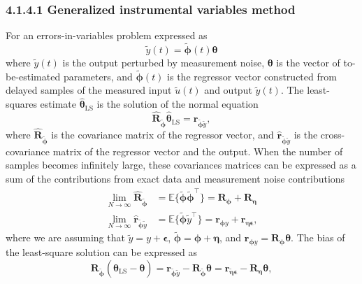 \documentclass[11pt]{article}
\begin{document}
\begin{itemize}
\begin{itemize}
        \subsubsection*{4.1.4.1 Generalized instrumental variables method}
        For an errors-in-variables problem expressed as
        \begin{equation} \tag{4.27} \widetilde{y}(t) = \widetilde{\bm{\phi}}(t) \bm{\theta}   \end{equation}
        where $\widetilde{y}(t)$ is the output perturbed by measurement noise, $\bm{\theta}$ is the vector of to-be-estimated parameters, and $\widetilde{\bm{\phi}}(t)$ is the regressor vector constructed from delayed samples of the measured input $\widetilde{u}(t)$ and output $\widetilde{y}(t)$.
        The least-squares estimate $\widehat{\bm{\theta}}_{\mathrm{LS}}$ is the solution of the normal equation
        \begin{equation} \tag{4.28} \widehat{\mathbf{R}}_{\widetilde{\bm{\phi}}} \widehat{\bm{\theta}}_{\mathrm{LS}} = \widehat{\mathbf{r}}_{\widetilde{\bm{\phi}} \widetilde{y}} , \label{eqn:norm} \end{equation}
        where $\widehat{\mathbf{R}}_{\widetilde{\bm{\phi}}}$ is the covariance matrix of the regressor vector, and $\widehat{\mathbf{r}}_{\widetilde{\bm{\phi}} \widetilde{y}}$ is the cross-covariance matrix of the regressor vector and the output.
        When the number of samples becomes infinitely large, these covariances matrices can be expressed as a sum of the contributions from exact data and measurement noise contributions
        \begin{equation} \tag{4.29} \begin{aligned}  \lim\limits_{N \rightarrow \infty} \widehat{\mathbf{R}}_{\widetilde{\bm{\phi}}} &= \mathbb{E} \{ \widetilde{\bm{\phi}} \widetilde{\bm{\phi}}^\top \} = \mathbf{R}_{\bm{\phi}} + \mathbf{R}_{\bm{\eta}} \\ \lim\limits_{N \rightarrow \infty} \widehat{\mathbf{r}}_{\widetilde{\bm{\phi}} \widetilde{y}} &= \mathbb{E}\{ \widetilde{\bm{\phi}} \widetilde{y}^\top \} = {\mathbf{r}}_{\bm{\phi} y} + {\mathbf{r}}_{\bm{\eta} \bm{\epsilon}} , \end{aligned} \end{equation}
        where we are assuming that $\widetilde{y} =  y +\bm{\epsilon}$, $\widetilde{\bm{\phi}} = \bm{\phi} + \bm{\eta}$, and $\mathbf{r}_{\bm{\phi} y} = \mathbf{R}_{{\bm{\phi}}} \bm{\theta}$.
        The bias of the least-square solution can be expressed as 
        \begin{equation} \tag{4.30} \mathbf{R}_{\widetilde{\bm{\phi}}} \left( \widehat{\bm{\theta}}_{\mathrm{LS}} - \bm{\theta} \right) = \mathbf{r}_{\widetilde{\bm{\phi}} \widetilde{y}} - \mathbf{R}_{\widetilde{\bm{\phi}}} \bm{\theta} = \mathbf{r}_{\widetilde{\bm{\eta}} \bm{\epsilon}} - \mathbf{R}_{\bm{\eta}} \bm{\theta} , \end{equation}


\end{itemize}
\end{itemize}
\end{document}
